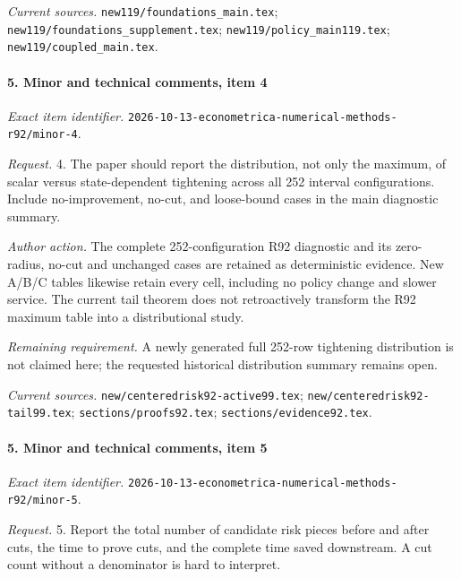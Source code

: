 \par\emph{Current sources.} \nolinkurl{new119/foundations_main.tex}; \nolinkurl{new119/foundations_supplement.tex}; \nolinkurl{new119/policy_main119.tex}; \nolinkurl{new119/coupled_main.tex}.

\paragraph{5. Minor and technical comments, item 4}

\emph{Exact item identifier.} \nolinkurl{2026-10-13-econometrica-numerical-methods-r92/minor-4}.

\par\emph{Request.} 4. The paper should report the distribution, not only the maximum, of scalar versus state-dependent tightening across all 252 interval configurations. Include no-improvement, no-cut, and loose-bound cases in the main diagnostic summary.

\par\emph{Author action.} The complete 252-configuration R92 diagnostic and its zero-radius, no-cut and unchanged cases are retained as deterministic evidence. New A/\allowbreak{}B/\allowbreak{}C tables likewise retain every cell, including no policy change and slower service. The current tail theorem does not retroactively transform the R92 maximum table into a distributional study.

\par\emph{Remaining requirement.} A newly generated full 252-row tightening distribution is not claimed here; the requested historical distribution summary remains open.

\par\emph{Current sources.} \nolinkurl{new/centeredrisk92-active99.tex}; \nolinkurl{new/centeredrisk92-tail99.tex}; \nolinkurl{sections/proofs92.tex}; \nolinkurl{sections/evidence92.tex}.

\paragraph{5. Minor and technical comments, item 5}

\emph{Exact item identifier.} \nolinkurl{2026-10-13-econometrica-numerical-methods-r92/minor-5}.

\par\emph{Request.} 5. Report the total number of candidate risk pieces before and after cuts, the time to prove cuts, and the complete time saved downstream. A cut count without a denominator is hard to interpret.

